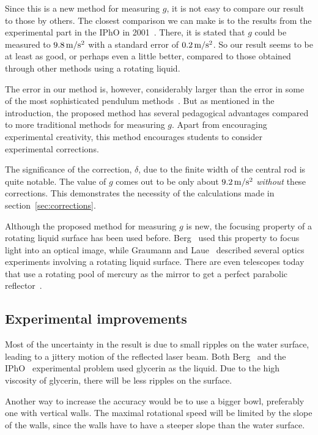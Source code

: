 \documentclass[12pt, a4paper, twocolumn]{article}
\begin{document}
Since this is a new method for measuring $g$, it is not easy to compare our result to those by others. The closest comparison we can make is to the results from the experimental part in the IPhO in 2001~\cite{IPhO2001}. There, it is stated that $g$ could be measured to $\unit[9.8]{m/s^2}$ with a standard error of $\unit[0.2]{m/s^2}$. So our result seems to be at least as good, or perhaps even a little better, compared to those obtained through other methods using a rotating liquid. 

The error in our method is, however, considerably larger than the error in some of the most sophisticated pendulum methods~\cite{Candela2001}. But as mentioned in the introduction, the proposed method has several pedagogical advantages compared to more traditional methods for measuring $g$. Apart from encouraging experimental creativity, this method encourages students to consider experimental corrections. 

The significance of the correction, $\delta$, due to the finite width of the central rod is quite notable. The value of $g$ comes out to be only about $\unit[9.2]{m/s^2}$ \emph{without} these corrections. This demonstrates the necessity of the calculations made in section~\ref{sec:corrections}. 

Although the proposed method for measuring $g$ is new, the focusing property of a rotating liquid surface has been used before. Berg~\cite{Berg1990} used this property to focus light into an optical image, while Graumann and Laue~\cite{Graumann1998} described several optics experiments involving a rotating liquid surface. 
There are even telescopes today that use a rotating pool of mercury as the mirror to get a perfect parabolic reflector~\cite{Shiga2008}.

\subsection{Experimental improvements}

Most of the uncertainty in the result is due to small ripples on the water surface, leading to a jittery motion of the reflected laser beam. Both Berg~\cite{Berg1990} and the IPhO~\cite{IPhO2001} experimental problem used glycerin as the liquid. Due to the high viscosity of glycerin, there will be less ripples on the surface.

Another way to increase the accuracy would be to use a bigger bowl, preferably one with vertical walls. The maximal rotational speed will be limited by the slope of the walls, since the walls have to have a steeper slope than the water surface.
\end{document}
